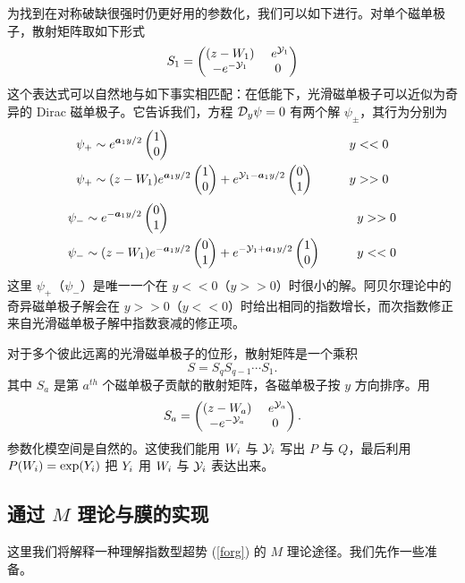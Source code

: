 为找到在对称破缺很强时仍更好用的参数化，我们可以如下进行。对单个磁单极子，散射矩阵取如下形式
\begin{equation}
S_1 = \begin{pmatrix} (z - { W}_1) &~ e^{{\mathcal Y}_1} \cr -e^{- {\mathcal Y}_1} &0\end{pmatrix}
\end{equation}
这个表达式可以自然地与如下事实相匹配：在低能下，光滑磁单极子可以近似为奇异的 Dirac 磁单极子。它告诉我们，方程 ${\mathcal D}_y\psi=0$ 有两个解 $\psi_\pm$，其行为分别为
\begin{align}
\psi_+ &\sim e^{{\boldsymbol{a}}_1 y/2}\begin{pmatrix}1 \cr 0 \end{pmatrix} 
\qquad & y<<0 \cr  \psi_+ &\sim (z-{ W}_1) e^{{\boldsymbol{a}}_1 y/2}
\begin{pmatrix}1 \cr 0 \end{pmatrix} + e^{{\mathcal Y}_1 -{\boldsymbol{a}}_1 y/2}
\begin{pmatrix}0 \cr 1 \end{pmatrix}\qquad &  y>>0
\end{align}
\begin{align}
\psi_- &\sim e^{-{\boldsymbol{a}}_1 y/2}\begin{pmatrix}0 \cr 1 \end{pmatrix}\qquad  & y>>0
 \cr  \psi_- &\sim (z-{ W}_1) e^{-{\boldsymbol{a}}_1 y/2}\begin{pmatrix}0 \cr 1 \end{pmatrix} 
 + e^{-{\mathcal Y}_1 +{\boldsymbol{a}}_1 y/2}\begin{pmatrix}1 \cr 0 \end{pmatrix} \qquad & y<<0
\end{align}
这里 $\psi_+$（$\psi_-$）是唯一一个在 $y<<0$（$y>>0$）时很小的解。阿贝尔理论中的奇异磁单极子解会在 $y>>0$（$y<<0$）时给出相同的指数增长，而次指数修正来自光滑磁单极子解中指数衰减的修正项。


对于多个彼此远离的光滑磁单极子的位形，散射矩阵是一个乘积
\begin{equation}\label{wellsep}
S = S_q S_{q-1} \cdots S_1.
\end{equation}
其中 $S_a$ 是第 $a^{th}$ 个磁单极子贡献的散射矩阵，各磁单极子按 $y$ 方向排序。用
\begin{equation}
S_a = \begin{pmatrix} (z - { W}_a) & ~e^{{\mathcal Y}_a} \cr -e^{- {\mathcal Y}_a} &0\end{pmatrix}.
\end{equation}
参数化模空间是自然的。这使我们能用 ${ W}_i$ 与 ${\mathcal Y}_i$ 写出 $P$ 与 $Q$，最后利用 $P({ W}_i)=\exp({ Y}_i)$ 把 ${ Y}_i$ 用 ${ W}_i$ 与 ${\mathcal Y}_i$ 表达出来。

\subsection{通过 $M$ 理论与膜的实现}\label{realm}

这里我们将解释一种理解指数型超势 (\ref{forg}) 的 $M$ 理论途径。我们先作一些准备。
